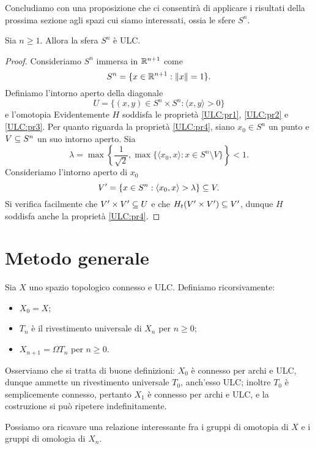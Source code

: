 Concludiamo con una proposizione che ci consentirà di applicare i risultati della prossima sezione agli spazi cui siamo interessati, ossia le sfere \(S^n\).

\begin{proposition}
Sia \(n\ge 1\). Allora la sfera \(S^n\) è ULC.
\end{proposition}
\begin{proof}
Consideriamo \(S^n\) immersa in \(\mathbb{R}^{n+1}\) come
\[
S^n=\{x\in\mathbb{R}^{n+1}:\left\lVert x\right\rVert=1\}.
\]
Definiamo l'intorno aperto della diagonale
\[
U=\{(x,y)\in S^n\times S^n:\langle x,y\rangle>0\}
\]
e l'omotopia
Evidentemente \(H\) soddisfa le proprietà \ref{ULC:pr1}, \ref{ULC:pr2} e \ref{ULC:pr3}. Per quanto riguarda la proprietà \ref{ULC:pr4}, siano \(x_0\in S^n\) un punto e \(V\subseteq S^n\) un suo intorno aperto. Sia
\[
\lambda=\max\left\{\frac{1}{\sqrt{2}},\max\{\langle x_0,x\rangle:x\in S^n\setminus V\}\right\}<1.
\]
Consideriamo l'intorno aperto di \(x_0\)
\[
V'=\{x\in S^n:\langle x_0,x\rangle>\lambda\}\subseteq V.
\]
Si verifica facilmente che \(V'\times V'\subseteq U\) e che \(H_t(V'\times V')\subseteq V'\), dunque \(H\) soddisfa anche la proprietà \ref{ULC:pr4}.
\end{proof}

\section{Metodo generale}

Sia \(X\) uno spazio topologico connesso e ULC. Definiamo ricorsivamente:
\begin{itemize}
\item \(X_0=X\);
\item \(T_n\) è il rivestimento universale di \(X_n\) per \(n\ge 0\);
\item \(X_{n+1}=\Omega T_n\) per \(n\ge 0\).
\end{itemize}
Osserviamo che si tratta di buone definizioni: \(X_0\) è connesso per archi e ULC, dunque ammette un rivestimento universale \(T_0\), anch'esso ULC; inoltre \(T_0\) è semplicemente connesso, pertanto \(X_1\) è connesso per archi e ULC, e la costruzione si può ripetere indefinitamente.

Possiamo ora ricavare una relazione interessante fra i gruppi di omotopia di \(X\) e i gruppi di omologia di \(X_n\).

